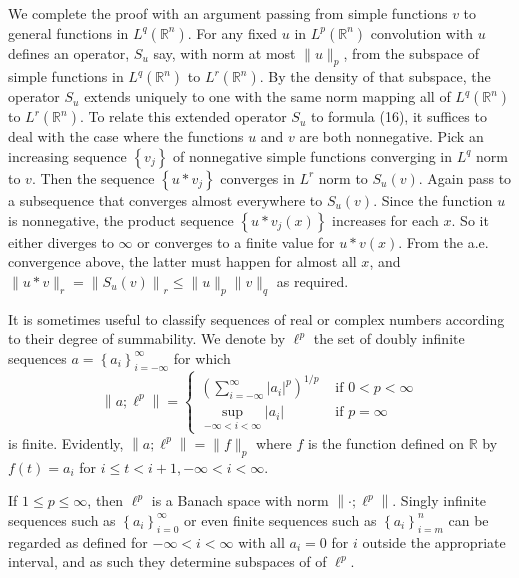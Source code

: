 \begin{para}
  We complete the proof with an argument passing from simple functions $v$ to general functions in $L^q(\mathbb{R}^n)$. For any fixed $u$ in $L^p(\mathbb{R}^n)$ convolution with $u$ defines an operator, $S_u$ say, with norm at most $\|u\|_p$, from the subspace of simple functions in $L^q(\mathbb{R}^n)$ to $L^r(\mathbb{R}^n)$. By the density of that subspace, the operator $S_u$ extends uniquely to one with the same norm mapping all of $L^q(\mathbb{R}^n)$ to $L^r(\mathbb{R}^n)$.
  To relate this extended operator $S_u$ to formula (16), it suffices to deal with the case where the functions $u$ and $v$ are both nonnegative. Pick an increasing sequence $\left\{v_j\right\}$ of nonnegative simple functions converging in $L^q$ norm to $v$. Then the sequence $\left\{u * v_j\right\}$ converges in $L^r$ norm to $S_u(v)$. Again pass to a subsequence
  that converges almost everywhere to $S_u(v)$. Since the function $u$ is nonnegative, the product sequence $\left\{u * v_j(x)\right\}$ increases for each $x$. So it either diverges to $\infty$ or converges to a finite value for $u * v(x)$. From the a.e. convergence above, the latter must happen for almost all $x$, and $\|u * v\|_r=\left\|S_u(v)\right\|_r \leq\|u\|_p\|v\|_q$ as required.
\end{para}

\begin{para}
  It is sometimes useful to classify sequences of real or complex numbers according to their degree of summability. We denote by $\ell^p$ the set of doubly infinite sequences $a=\left\{a_i\right\}_{i=-\infty}^{\infty}$ for which
  \[
  \left\|a ; \ell^p\right\|= \begin{cases}\left(\sum_{i=-\infty}^{\infty}\left|a_i\right|^p\right)^{1 / p} & \text { if } 0<p<\infty \\ \sup _{-\infty<i<\infty}\left|a_i\right| & \text { if } p=\infty\end{cases}
  \]
  is finite. Evidently, $\left\|a ; \ell^p\right\|=\|f\|_p$ where $f$ is the function defined on $\mathbb{R}$ by $f(t)=a_i$ for $i \leq t<i+1,-\infty<i<\infty$.
  
  If $1 \leq p \leq \infty$, then $\ell^p$ is a Banach space with norm $\left\|\cdot ; \ell^p\right\|$. Singly infinite sequences such as $\left\{a_i\right\}_{i=0}^{\infty}$ or even finite sequences such as $\left\{a_i\right\}_{i=m}^n$ can be regarded as defined for $-\infty<i<\infty$ with all $a_i=0$ for $i$ outside the appropriate interval, and as such they determine subspaces of of $\ell^p$.
\end{para}

